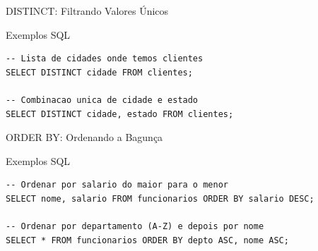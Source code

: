 \documentclass[9pt]{beamer}
\begin{document}
\begin{frame}[fragile]{DISTINCT: Filtrando Valores Únicos}
  \centering
  \vspace{0.4cm}
  \begin{exampleblock}{Exemplos SQL}
\begin{lstlisting}
-- Lista de cidades onde temos clientes
SELECT DISTINCT cidade FROM clientes;

-- Combinacao unica de cidade e estado
SELECT DISTINCT cidade, estado FROM clientes;
\end{lstlisting}
  \end{exampleblock}
\end{frame}

\begin{frame}[fragile]{ORDER BY: Ordenando a Bagunça}
  \centering
  \vspace{0.4cm}
  \begin{exampleblock}{Exemplos SQL}
\begin{lstlisting}
-- Ordenar por salario do maior para o menor
SELECT nome, salario FROM funcionarios ORDER BY salario DESC;

-- Ordenar por departamento (A-Z) e depois por nome
SELECT * FROM funcionarios ORDER BY depto ASC, nome ASC;
\end{lstlisting}
  \end{exampleblock}
\end{frame}
\end{document}
